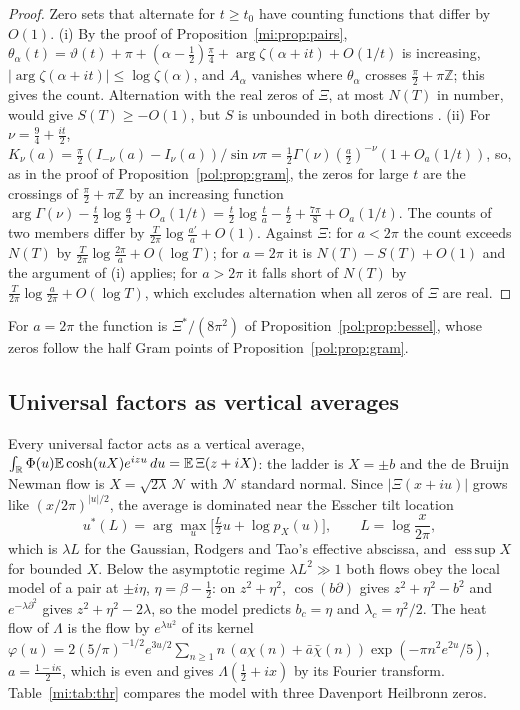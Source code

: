 \begin{proof}
Zero sets that alternate for $t\ge t_0$ have counting functions that differ by $O(1)$. (i) By the proof of Proposition~\ref{mi:prop:pairs}, $\theta_\alpha(t)=\vartheta(t)+\pi+(\alpha-\frac12)\frac\pi4+\arg\zeta(\alpha+it)+O(1/t)$ is increasing, $|\arg\zeta(\alpha+it)|\le\log\zeta(\alpha)$, and $A_\alpha$ vanishes where $\theta_\alpha$ crosses $\frac\pi2+\pi\mathbb Z$; this gives the count. Alternation with the real zeros of $\Xi$, at most $N(T)$ in number, would give $S(T)\ge-O(1)$, but $S$ is unbounded in both directions \cite{Selberg46}. (ii) For $\nu=\frac94+\frac{it}2$, $K_\nu(a)=\frac\pi2(I_{-\nu}(a)-I_\nu(a))/\sin\nu\pi=\frac12\Gamma(\nu)(\frac a2)^{-\nu}(1+O_a(1/t))$, so, as in the proof of Proposition~\ref{pol:prop:gram}, the zeros for large $t$ are the crossings of $\frac\pi2+\pi\mathbb Z$ by an increasing function $\arg\Gamma(\nu)-\frac t2\log\frac a2+O_a(1/t)=\frac t2\log\frac ta-\frac t2+\frac{7\pi}8+O_a(1/t)$. The counts of two members differ by $\frac T{2\pi}\log\frac{a'}a+O(1)$. Against $\Xi$: for $a<2\pi$ the count exceeds $N(T)$ by $\frac T{2\pi}\log\frac{2\pi}a+O(\log T)$; for $a=2\pi$ it is $N(T)-S(T)+O(1)$ and the argument of (i) applies; for $a>2\pi$ it falls short of $N(T)$ by $\frac T{2\pi}\log\frac a{2\pi}+O(\log T)$, which excludes alternation when all zeros of $\Xi$ are real.
\end{proof}

For $a=2\pi$ the function is $\Xi^*/(8\pi^2)$ of Proposition~\ref{pol:prop:bessel}, whose zeros follow the half Gram points of Proposition~\ref{pol:prop:gram}.

\subsection{Universal factors as vertical averages}\label{mi:sec:vertical}

Every universal factor acts as a vertical average, $\int_{\mathbb{R}}\Phi(u)\mathbb{E}\cosh(uX)e^{izu}\,du=\mathbb{E}\,\Xi(z+iX)$: the ladder is $X=\pm b$ and the de Bruijn Newman flow is $X=\sqrt{2\lambda}\,\mathcal N$ with $\mathcal N$ standard normal. Since $|\Xi(x+iu)|$ grows like $(x/2\pi)^{|u|/2}$, the average is dominated near the Esscher tilt location
\[
u^*(L)=\arg\max_u\big[\tfrac L2u+\log p_X(u)\big],\qquad L=\log\frac x{2\pi},
\]
which is $\lambda L$ for the Gaussian, Rodgers and Tao's effective abscissa, and $\operatorname{ess\,sup}X$ for bounded $X$. Below the asymptotic regime $\lambda L^2\gg1$ both flows obey the local model of a pair at $\pm i\eta$, $\eta=\beta-\frac12$: on $z^2+\eta^2$, $\cos(b\partial)$ gives $z^2+\eta^2-b^2$ and $e^{-\lambda\partial^2}$ gives $z^2+\eta^2-2\lambda$, so the model predicts $b_c=\eta$ and $\lambda_c=\eta^2/2$. The heat flow of $\Lambda$ is the flow by $e^{\lambda u^2}$ of its kernel $\varphi(u)=2(5/\pi)^{-1/2}e^{3u/2}\sum_{n\ge1}n\,(a\chi(n)+\bar a\bar\chi(n))\exp(-\pi n^2e^{2u}/5)$, $a=\frac{1-i\kappa}2$, which is even and gives $\Lambda(\frac12+ix)$ by its Fourier transform. Table~\ref{mi:tab:thr} compares the model with three Davenport Heilbronn zeros.

